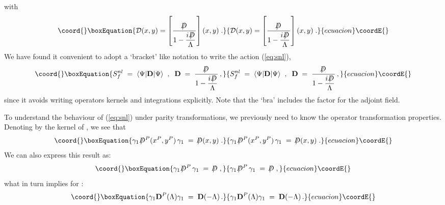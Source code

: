 \documentclass[a4paper,12pt]{article}
\providecommand{\Dcslash}{/\!\!\!\! D}
\begin{document}
with
\begin{equation}\coord{}\boxEquation{
{\mathcal
  D}(x,y)=\left[\frac{\Dcslash}{1-\displaystyle{\frac{i\,\Dcslash}{\Lambda}}}\right]
(x,y) \;.
}{
{\mathcal
  D}(x,y)=\left[\frac{\Dcslash}{1-\displaystyle{\frac{i\,\Dcslash}{\Lambda}}}\right]
(x,y) \;.
}{ecuacion}\coordE{}\end{equation}
We have found it convenient to adopt a `bracket' like notation to
write the action (\ref{eq:snl}),
\begin{equation}\coord{}\boxEquation{
  \label{eq:snl1}
  S_f^{nl}\;=\; \langle\Psi|\mathbf{D}|\Psi\rangle \;\;,\;\; 
{\mathbf D}\;=\; \frac{\Dcslash}{1-\displaystyle{\frac{i\,\Dcslash}{\Lambda}}}\,,
}{
  S_f^{nl}\;=\; \langle\Psi|\mathbf{D}|\Psi\rangle \;\;,\;\; 
{\mathbf D}\;=\; \frac{\Dcslash}{1-\displaystyle{\frac{i\,\Dcslash}{\Lambda}}}\,,
}{ecuacion}\coordE{}\end{equation}
since it avoids writing operators kernels and integrations explicitly.
Note that the `bra' includes the \coordHE{} factor for the adjoint
field.

To understand the behaviour of (\ref{eq:snl}) under parity
transformations, we previously need to know the \coordHE{} operator
transformation properties. Denoting by \myHighlight{$\Dcslash(x,y)$}\coordHE{} the kernel of
\myHighlight{$\Dcslash$}\coordHE{}, we see that
\begin{equation}\coord{}\boxEquation{
\gamma_1 \,\Dcslash^P(x^P,y^P) \,\gamma_1 \;=\; \Dcslash(x,y) \;.
}{
\gamma_1 \,\Dcslash^P(x^P,y^P) \,\gamma_1 \;=\; \Dcslash(x,y) \;.
}{ecuacion}\coordE{}\end{equation}
We can also express this result as:
\begin{equation}\coord{}\boxEquation{
\label{Dcparity}
\gamma_1\, \Dcslash^P \,\gamma_1 \;=\;\Dcslash \;,
}{
\gamma_1\, \Dcslash^P \,\gamma_1 \;=\;\Dcslash \;,
}{ecuacion}\coordE{}\end{equation}
what in turn implies for \coordHE{}:
\begin{equation}\coord{}\boxEquation{
\label{DParity}
\gamma_1{\mathbf D}^P(\Lambda)\gamma_1 \;=\; {\mathbf D(-\Lambda)}\,.
}{
\gamma_1{\mathbf D}^P(\Lambda)\gamma_1 \;=\; {\mathbf D(-\Lambda)}\,.
}{ecuacion}\coordE{}\end{equation}
\end{document}

